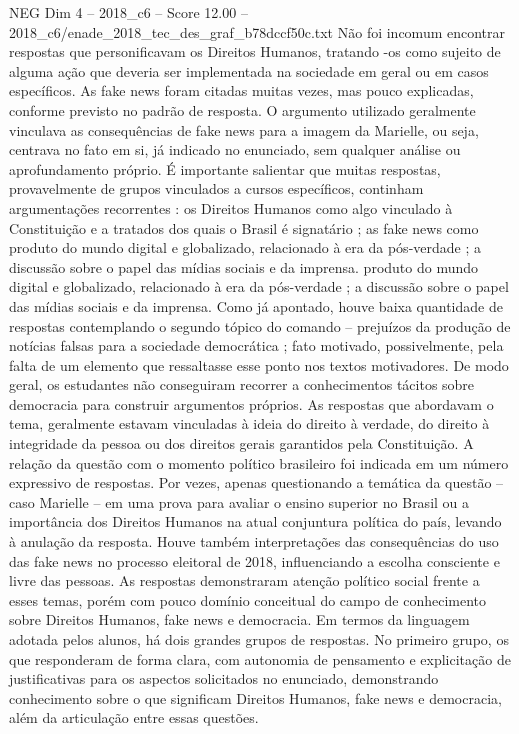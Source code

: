 \begin{textsample}{NEG Dim 4 – 2018\_c6 – Score 12.00 – 2018\_c6/enade\_2018\_tec\_des\_graf\_b78dccf50c.txt}
Não foi incomum encontrar respostas que personificavam os Direitos Humanos, tratando -os como sujeito de alguma ação que deveria ser implementada na sociedade em geral ou em casos específicos.
As fake news foram citadas muitas vezes, mas pouco explicadas, conforme previsto no padrão de resposta.
O argumento utilizado geralmente vinculava as consequências de fake news para a imagem da Marielle, ou seja, centrava no fato em si, já indicado no enunciado, sem qualquer análise ou aprofundamento próprio.
É importante salientar que muitas respostas, provavelmente de grupos vinculados a cursos específicos, continham argumentações recorrentes : os Direitos Humanos como algo vinculado à Constituição e a tratados dos quais o Brasil é signatário ; as fake news como produto do mundo digital e globalizado, relacionado à era da pós-verdade ; a discussão sobre o papel das mídias sociais e da imprensa. produto do mundo digital e globalizado, relacionado à era da pós-verdade ; a discussão sobre o papel das mídias sociais e da imprensa.
Como já apontado, houve baixa quantidade de respostas contemplando o segundo tópico do comando – prejuízos da produção de notícias falsas para a sociedade democrática ; fato motivado, possivelmente, pela falta de um elemento que ressaltasse esse ponto nos textos motivadores.
De modo geral, os estudantes não conseguiram recorrer a conhecimentos tácitos sobre democracia para construir argumentos próprios.
As respostas que abordavam o tema, geralmente estavam vinculadas à ideia do direito à verdade, do direito à integridade da pessoa ou dos direitos gerais garantidos pela Constituição.
A relação da questão com o momento político brasileiro foi indicada em um número expressivo de respostas.
Por vezes, apenas questionando a temática da questão – caso Marielle – em uma prova para avaliar o ensino superior no Brasil ou a importância dos Direitos Humanos na atual conjuntura política do país, levando à anulação da resposta.
Houve também interpretações das consequências do uso das fake news no processo eleitoral de 2018, influenciando a escolha consciente e livre das pessoas.
As respostas demonstraram atenção político social frente a esses temas, porém com pouco domínio conceitual do campo de conhecimento sobre Direitos Humanos, fake news e democracia.
Em termos da linguagem adotada pelos alunos, há dois grandes grupos de respostas.
No primeiro grupo, os que responderam de forma clara, com autonomia de pensamento e explicitação de justificativas para os aspectos solicitados no enunciado, demonstrando conhecimento sobre o que significam Direitos Humanos, fake news e democracia, além da articulação entre essas questões.

\end{textsample}
